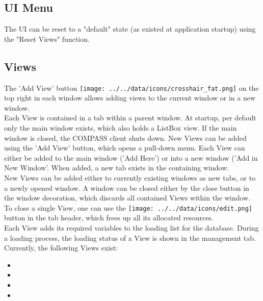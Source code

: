\subsection{UI Menu}
\label{sec:ui_overview_ui_menu}

The UI can be reset to a "default" state (as existed at application startup) using the "Reset Views" function.







%

% 
% 

% 

\subsection{Views}
The 'Add View' button \texttt{[image: ../../data/icons/crosshair\_fat.png]} on the top right in each window allows adding views to the current window or in a new window. \\

Each View is contained in a tab within a parent window.  At startup, per default only the main window exists, which also holds
a ListBox view. If the main window is closed, the COMPASS client shuts down. New Views can be added using the 'Add View' button, which opens a pull-down menu. Each View can either be added to the main window ('Add Here') or into a new window ('Add in New Window'. When added, a new tab exists in the containing window. \\

New Views can be added either to currently existing windows as new tabs, or to a newly opened window. A window can be closed either by the close button in the window decoration, which discards all contained Views within the window.  \\

To close a single View, one can use the \texttt{[image: ../../data/icons/edit.png]} button in the tab header, which frees up all its allocated resources. \\

Each View adds its required variables to the loading list for the database. During a loading process, the loading status  of a View is shown in the management tab.\\

Currently, the following Views exist:
\begin{itemize}
 \item {}
 \item {}
 \item {}
 \item {}
\end{itemize}

